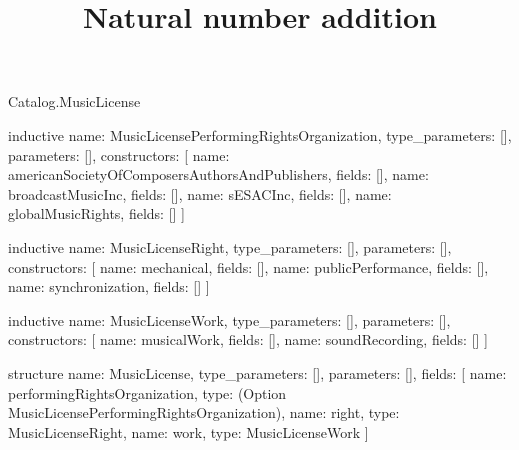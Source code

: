 \begin{lexlean}{Catalog.MusicLicense}
\title{Natural number addition}
\begin{semanticmodule}
inductive{
  name: MusicLicensePerformingRightsOrganization,
  type_parameters: [],
  parameters: [],
  constructors: [
    {name: americanSocietyOfComposersAuthorsAndPublishers, fields: []},
    {name: broadcastMusicInc, fields: []},
    {name: sESACInc, fields: []},
    {name: globalMusicRights, fields: []}
  ]
}

inductive{
  name: MusicLicenseRight,
  type_parameters: [],
  parameters: [],
  constructors: [
    {name: mechanical, fields: []},
    {name: publicPerformance, fields: []},
    {name: synchronization, fields: []}
  ]
}

inductive{
  name: MusicLicenseWork,
  type_parameters: [],
  parameters: [],
  constructors: [
    {name: musicalWork, fields: []},
    {name: soundRecording, fields: []}
  ]
}

structure{
  name: MusicLicense,
  type_parameters: [],
  parameters: [],
  fields: [
    {name: performingRightsOrganization, type: (Option MusicLicensePerformingRightsOrganization)},
    {name: right, type: MusicLicenseRight},
    {name: work, type: MusicLicenseWork}
  ]
}
\end{semanticmodule}
\end{lexlean}

